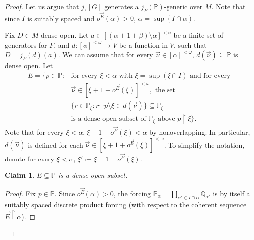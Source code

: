 \documentclass[10pt,a4paper]{amsart}
\newtheorem{claim}{Claim}
\newcommand{\po}{\mathbb{P}}
\newcommand{\qo}{\mathbb{Q}}
\newcommand{\uhr}{\upharpoonright}
\begin{document}
    \begin{proof}
        Let us argue that $j_F[G]$ generates a $j_F(\po)$-generic over $M$. Note that since $I$ is suitably spaced and $o^{\vec E}(\alpha)>0$, $\alpha = \sup(I\cap \alpha)$.
        
        Fix $D\in M$ dense open. Let $a\in [(\alpha+1+\beta)\setminus \alpha]^{<\omega}$ be a finite set of generators for $F$, and $d\colon [\alpha]^{<\omega}\to V$ be a function in $V$, such that $D = j_F(d)(a)$. We can assume that for every $\vec{\nu}\in [\alpha]^{<\omega}$, $d(\vec{\nu})\subseteq \po$ is dense open. Let
    \begin{align*}
        E = \{ p\in \po \colon &\text{for every }\xi<\alpha \text{ with }\xi= \sup(\xi\cap I) \text{ and for every }\\ &\vec{\nu}\in [ \xi+1+o^{\vec{E}}(\xi) ]^{<\omega}, \text{ the set}\\
        &\{ r\in \po_\xi \colon r{}^\frown p\setminus  \xi \in d(\vec{\nu})\}\subseteq \po_\xi\\
        &\text{is a dense open subset of }\po_{\xi} \text{ above } p\uhr \xi \}.
    \end{align*}
    Note that for every $\xi<\alpha$,  $\xi+1+o^{\vec{E}}(\xi)<\alpha$ by nonoverlapping. In particular, $d(\vec{\nu})$ is defined for each $\vec{\nu}\in [\xi+1+o^{\vec E}(\xi)]^{<\omega}$. To simplify the notation, denote for every $\xi<\alpha$, $\xi':=\xi+1+o^{\vec E}(\xi)$.
    
    \begin{claim}\label{Claim:TheSetE}
        $E\subseteq \po$ is a dense open subset.
    \end{claim}

    \begin{proof}
        Fix $p\in \po$. Since $o^{\vec{E}}(\alpha)>0$, the forcing $\po_\alpha = \prod_{\alpha'\in I\cap \alpha}\qo_{\alpha'}$ is by itself a suitably spaced discrete product forcing (with respect to the coherent sequence $\vec{E}\uhr \alpha$). 
        

\end{proof}
\end{proof}
\end{document}
